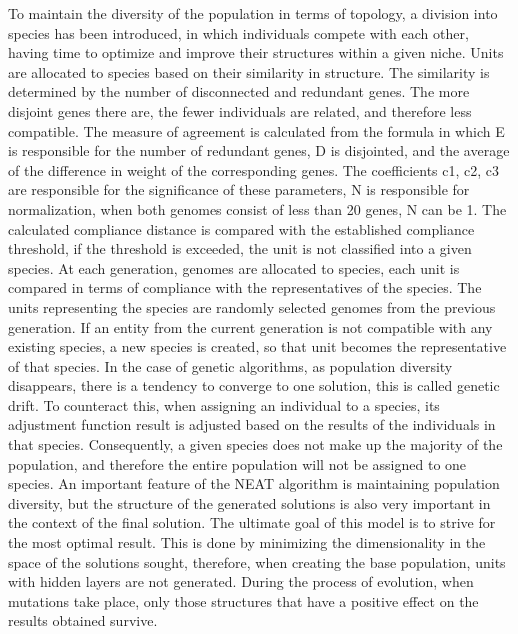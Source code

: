 To maintain the diversity of the population in terms of topology, a division into species has been 
introduced, in which individuals compete with each other, having time to optimize and improve 
their structures within a given niche. 
Units are allocated to species based on their similarity in structure. 
The similarity is determined by the number of disconnected and redundant genes. 
The more disjoint genes there are, the fewer individuals are related, and therefore 
less compatible. The measure of agreement is calculated from the formula in which E 
is responsible for the number of redundant genes, D is disjointed, and the average of the 
difference in weight of the corresponding genes. 
The coefficients c1, c2, c3 are responsible for the significance of these parameters, 
N is responsible for normalization, when both genomes consist of less than 20 genes, N can be 1. 
The calculated compliance distance is compared with the established compliance threshold, 
if the threshold is exceeded, the unit is not classified into a given species. 
At each generation, genomes are allocated to species, each unit is compared in terms of 
compliance with the representatives of the species. The units representing the species are 
randomly selected genomes from the previous generation. 
If an entity from the current generation is not compatible with any existing species, 
a new species is created, so that unit becomes the representative of that species. 
In the case of genetic algorithms, as population diversity disappears, there is a tendency to 
converge to one solution, this is called genetic drift. 
To counteract this, when assigning an individual to a species, its adjustment function result is 
adjusted based on the results of the individuals in that species. 
Consequently, a given species does not make up the majority of the population, and therefore the 
entire population will not be assigned to one species. 
An important feature of the NEAT algorithm is maintaining population diversity, but the structure 
of the generated solutions is also very important in the context of the final solution. 
The ultimate goal of this model is to strive for the most optimal result. 
This is done by minimizing the dimensionality in the space of the solutions sought, therefore, 
when creating the base population, units with hidden layers are not generated. 
During the process of evolution, when mutations take place, only those structures that have a 
positive effect on the results obtained survive.
